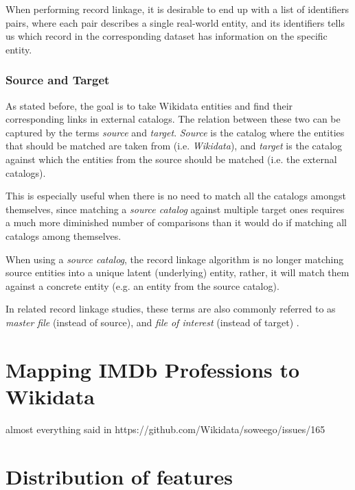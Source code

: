 \documentclass[epsfig,a4paper,11pt,titlepage,twoside,openany]{book}
\begin{document}
When performing record linkage, it is desirable to end up with a list of identifiers pairs, where each pair describes a single real-world entity, and its identifiers tells us which record in the corresponding dataset has information on the specific entity.


\subsubsection{Source and Target}
\label{sec:rl-term-source-and-target}

As stated before, the goal is to take Wikidata entities and find their corresponding links in external catalogs. The relation between these two can be captured by the terms \textit{source} and \textit{target}. \textit{Source} is the catalog where the entities that should be matched are taken from (i.e. \textit{Wikidata}), and \textit{target} is the catalog against which the entities from the source should be matched (i.e. the external catalogs).

This is especially useful when there is no need to match all the catalogs amongst
themselves, since matching a \textit{source catalog} against multiple target ones
requires a much more diminished number of comparisons than it would do if matching all catalogs among themselves.

When using a \textit{source catalog}, the record linkage algorithm is no longer matching
source entities into a unique latent (underlying) entity, rather, it will match
them against a concrete entity (e.g. an entity from the source catalog).

In related record linkage studies, these terms are also commonly referred to as \cite{Sayers2015}
\textit{master file} (instead of source), and \textit{file of interest} (instead
of target) .
   

\section{Mapping IMDb Professions to Wikidata}
\label{sec:imdb-profs-to-wikidata}


almost everything said in https://github.com/Wikidata/soweego/issues/165


\section{Distribution of features}
\label{sec:apx-feature-distribution}
\end{document}
